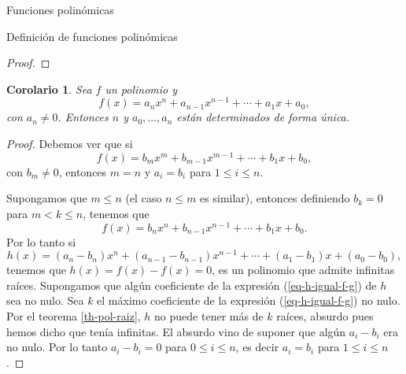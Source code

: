 \documentclass[a4paper,12pt,twoside,spanish,reqno]{amsbook}
\newtheorem{corolario}[teorema]{Corolario}
\theoremstyle{definition}
\theoremstyle{remark}
\newcommand{\K}{\mathbb K}
\begin{document}
\begin{chapter}{Funciones polinómicas}
\begin{section}{Definición de funciones polinómicas}
\begin{proof}
\begin{comment}
			Sea $n >0$. Supongamos que el resultado es cierto para los polinomios de grado  $\le n-1$ (hipótesis inductiva). Si $f$ no tiene raíces, está probado nuestro enunciado. En  caso contrario existe $c_1 \in \K$ tal que $f(c_1) =0$. Por el teorema \ref{th-fact-raiz}, 
			\begin{equation*}
			f(x) = (x-c_1)h_1(x)
			\end{equation*}
			con $h_1$ un polinomio de grado $\le n-1$. Luego, por hipótesis inductiva
			\begin{equation*}
			h_1(x) = (x-d_1)(x-d_2)\cdots(x-d_r)g_r,
			\end{equation*} 
			con $r \le n-1$ y $g_r$ que no tiene raíces. Entonces,
			\begin{equation*}
			f(x) = (x-c_1)(x-d_1)(x-d_2)\cdots(x-d_r)g_r,
			\end{equation*}
			con $r \le n-1$ y $g_r$ que no tiene raíces. Esto es equivalente a (\ref{eq-desc-rai}).   
		\end{comment}
		
	\end{proof}
						
	\begin{corolario}
		Sea $f$ un polinomio y 
		\begin{equation*}
			f(x) = a_nx^n + a_{n-1}x^{n-1}+\cdots + a_1x +a_0,
		\end{equation*}
		con $a_n \ne 0$.  Entonces $n$ y $a_0,\ldots,a_n$ están determinados de forma única.
	\end{corolario}
	\begin{proof}
		Debemos ver que si 
		\begin{equation*}
		f(x) = b_mx^m + b_{m-1}x^{m-1}+\cdots + b_1x +b_0,
		\end{equation*}
		con $b_m \ne 0$, entonces $m=n$ y $a_i=b_i$ para $1 \le i \le n$. 
		
		Supongamos que $m \le n$ (el caso $n \le m$ es similar), entonces definiendo $b_k=0$ para $m < k \le n$, tenemos que
		\begin{equation*}
		f(x) = b_nx^n + b_{n-1}x^{n-1}+\cdots + b_1x +b_0.
		\end{equation*}
		Por lo tanto si 
		\begin{equation}\label{eq-h-igual-f-g}
			h(x) = (a_n- b_n)x^n + (a_{n-1}-b_{n-1})x^{n-1}+\cdots + (a_{1}-b_{1})x +(a_{0}-b_{0}), 
		\end{equation}
		tenemos  que $h(x)= f(x)-f(x)=0$,  es un polinomio que admite infinitas raíces. 
		Supongamos  que algún coeficiente de la expresión (\ref{eq-h-igual-f-g}) de $h$ sea no nulo. Sea $k$  el máximo coeficiente de la expresión (\ref{eq-h-igual-f-g}) no nulo. Por el teorema   \ref{th-pol-raiz}, $h$ no  puede tener más de $k$ raíces, absurdo pues hemos dicho que tenía infinitas. El absurdo vino de suponer que algún $a_i-b_i$ era no nulo. Por lo tanto $a_i -b_i=0$ para $0 \le i \le n$,  es decir $a_i=b_i$ para $1 \le i \le n$. 
		

\end{proof}
\end{section}
\end{chapter}
\end{document}
